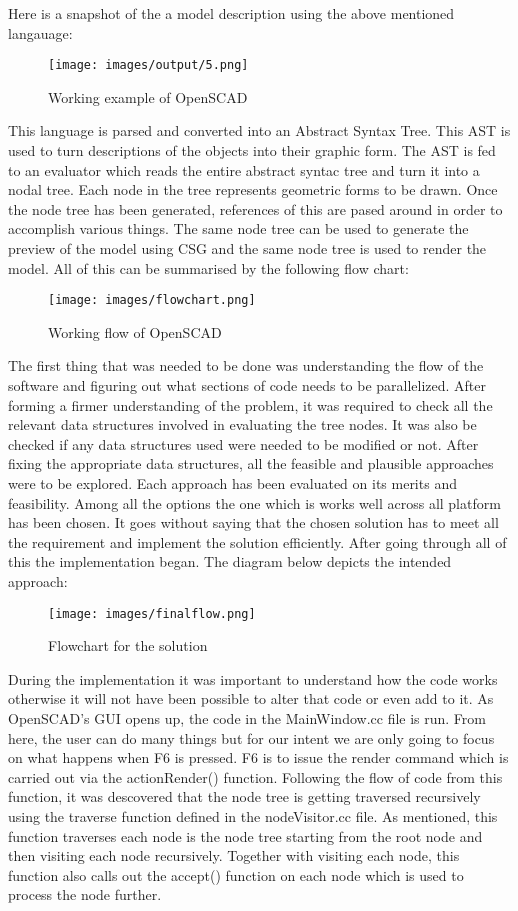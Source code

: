 Here is a snapshot of the a model description using the above mentioned langauage:
\begin{figure}
    \centering \texttt{[image: images/output/5.png]}
    \caption{Working example of OpenSCAD}
    \label{fig:1}
\end{figure}
This language is parsed and converted into an Abstract Syntax Tree. This AST is used to turn descriptions of the objects into their graphic form. The AST is fed to an evaluator which reads the entire abstract syntac tree and turn it into a nodal tree. Each node in the tree represents geometric forms to be drawn. Once the node tree has been generated, references of this are pased around in order to accomplish various things. The same node tree can be used to generate the preview of the model using CSG and the same node tree is used to render the model. All of this can be summarised by the following flow chart:
\begin{figure}
    \centering 
    \texttt{[image: images/flowchart.png]}
    \caption{Working flow of OpenSCAD}
\end{figure}
The first thing that was needed to be done was understanding the flow of the software and figuring out what sections of code needs to be parallelized. After forming a firmer understanding of the problem, it was required to check all the relevant data structures involved in evaluating the tree nodes. It was also be checked if any data structures used were needed to be modified or not. After fixing the appropriate data structures, all the feasible and plausible approaches were to be explored. Each approach has been evaluated on its merits and feasibility. Among all the options the one which is works well across all platform has been chosen. It goes without saying that the chosen solution has to meet all the requirement and implement the solution efficiently. After going through all of this the implementation began. The diagram below depicts the intended approach:
\begin{figure}
    \centering 
    \texttt{[image: images/finalflow.png]}
    \caption{Flowchart for the solution}
\end{figure}
During the implementation it was important to understand how the code works otherwise it will not have been possible to alter that code or even add to it. As OpenSCAD's GUI opens up, the code in the MainWindow.cc file is run. From here, the user can do many things but for our intent we are only going to focus on what happens when F6 is pressed. F6 is to issue the render command which is carried out via the actionRender() function. Following the flow of code from this function, it was descovered that the node tree is getting traversed recursively using the traverse function defined in the nodeVisitor.cc file. As mentioned, this function traverses each node is the node tree starting from the root node and then visiting each node recursively. Together with visiting each node, this function also calls out the accept() function on each node which is used to process the node further.\\
